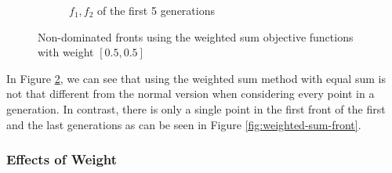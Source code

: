 \begin{figure}[ht]
\begin{subfigure}{0.48\textwidth}
        \caption{\(f_1, f_2\) of the first 5 generations}
        \label{fig:weighted-sum-generation}
    \end{subfigure}
    \hfill
    \caption{Non-dominated fronts using the weighted sum objective functions with weight \([0.5, 0.5]\)}
\end{figure}

In Figure \ref{fig:weighted-sum-generation}, we can see that using the weighted sum method with equal sum is not that different from the normal version when considering every point in a generation. In contrast, there is only a single point in the first front of the first and the last generations as can be seen in Figure \ref{fig:weighted-sum-front}.

\subsubsection*{Effects of Weight}

